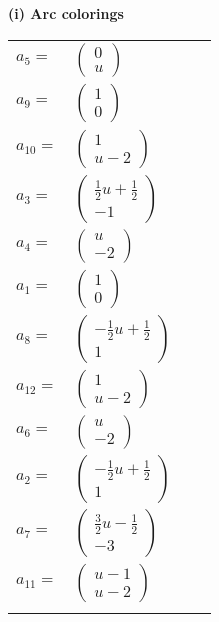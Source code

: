 \documentclass[1p]{elsarticle_modified}
\theoremstyle{definition}
\begin{document}
\flushleft \textbf{(i) Arc colorings}\\
\begin{tabular}{m{7pt} m{180pt} m{7pt} m{180pt} }
\flushright $a_{5}=$&$\begin{pmatrix}0\\u\end{pmatrix}$ \\
\flushright $a_{9}=$&$\begin{pmatrix}1\\0\end{pmatrix}$ \\
\flushright $a_{10}=$&$\begin{pmatrix}1\\u-2\end{pmatrix}$ \\
\flushright $a_{3}=$&$\begin{pmatrix}\frac{1}{2} u+\frac{1}{2}\\-1\end{pmatrix}$ \\
\flushright $a_{4}=$&$\begin{pmatrix}u\\-2\end{pmatrix}$ \\
\flushright $a_{1}=$&$\begin{pmatrix}1\\0\end{pmatrix}$ \\
\flushright $a_{8}=$&$\begin{pmatrix}-\frac{1}{2} u+\frac{1}{2}\\1\end{pmatrix}$ \\
\flushright $a_{12}=$&$\begin{pmatrix}1\\u-2\end{pmatrix}$ \\
\flushright $a_{6}=$&$\begin{pmatrix}u\\-2\end{pmatrix}$ \\
\flushright $a_{2}=$&$\begin{pmatrix}-\frac{1}{2} u+\frac{1}{2}\\1\end{pmatrix}$ \\
\flushright $a_{7}=$&$\begin{pmatrix}\frac{3}{2} u-\frac{1}{2}\\-3\end{pmatrix}$ \\
\flushright $a_{11}=$&$\begin{pmatrix}u-1\\u-2\end{pmatrix}$\\&\end{tabular}
\end{document}

